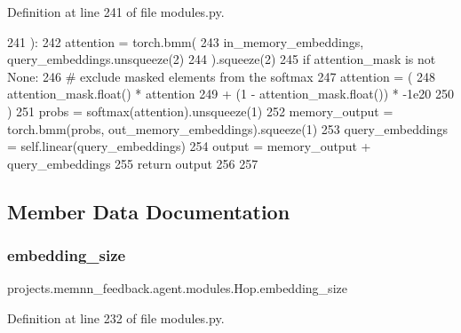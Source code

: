 Definition at line 241 of file modules.\+py.


\begin{DoxyCode}
241     ):
242         attention = torch.bmm(
243             in\_memory\_embeddings, query\_embeddings.unsqueeze(2)
244         ).squeeze(2)
245         \textcolor{keywordflow}{if} attention\_mask \textcolor{keywordflow}{is} \textcolor{keywordflow}{not} \textcolor{keywordtype}{None}:
246             \textcolor{comment}{# exclude masked elements from the softmax}
247             attention = (
248                 attention\_mask.float() * attention
249                 + (1 - attention\_mask.float()) * -1e20
250             )
251         probs = softmax(attention).unsqueeze(1)
252         memory\_output = torch.bmm(probs, out\_memory\_embeddings).squeeze(1)
253         query\_embeddings = self.linear(query\_embeddings)
254         output = memory\_output + query\_embeddings
255         \textcolor{keywordflow}{return} output
256 
257 
\end{DoxyCode}


\subsection{Member Data Documentation}
\mbox{\label{classprojects_1_1memnn__feedback_1_1agent_1_1modules_1_1Hop_a8fb50dd7d635522ebe5b2d36f6d4bc48}} 
\subsubsection{\texorpdfstring{embedding\+\_\+size}{embedding\_size}}
{\footnotesize\ttfamily projects.\+memnn\+\_\+feedback.\+agent.\+modules.\+Hop.\+embedding\+\_\+size}



Definition at line 232 of file modules.\+py.

\mbox{\label{classprojects_1_1memnn__feedback_1_1agent_1_1modules_1_1Hop_a373c95e927a46152f811742f2653030f}} 
